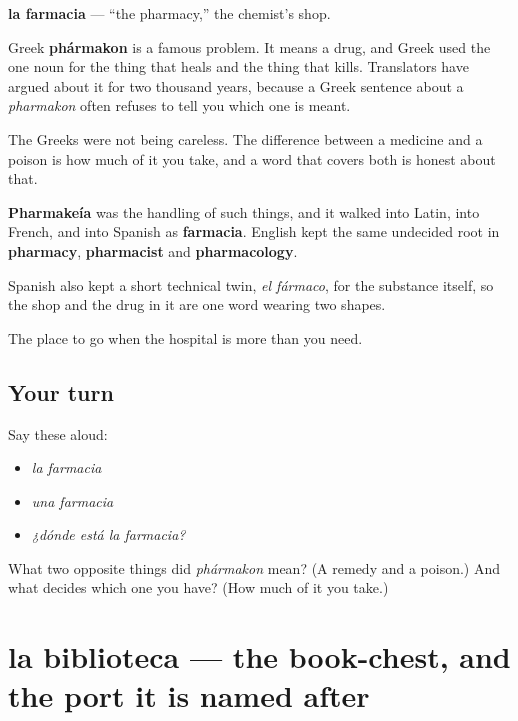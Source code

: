 \begin{cousinweb}
\textbf{la farmacia} — \textquotedblleft{}the pharmacy,\textquotedblright{} the chemist's shop.

Greek \textbf{phármakon} is a famous problem. It means a drug, and Greek used the one noun for the thing that heals and the thing that kills. Translators have argued about it for two thousand years, because a Greek sentence about a \emph{pharmakon} often refuses to tell you which one is meant.

The Greeks were not being careless. The difference between a medicine and a poison is how much of it you take, and a word that covers both is honest about that.

\textbf{Pharmakeía} was the handling of such things, and it walked into Latin, into French, and into Spanish as \textbf{farmacia}. English kept the same undecided root in \textbf{pharmacy}, \textbf{pharmacist} and \textbf{pharmacology}.

Spanish also kept a short technical twin, \emph{el fármaco}, for the substance itself, so the shop and the drug in it are one word wearing two shapes.
\end{cousinweb}

\begin{grammarlens}[title={What you've built}]
The place to go when the hospital is more than you need.
\end{grammarlens}

\subsection*{Your turn}
Say these aloud:

\begin{itemize}
\raggedright
  \item \emph{la farmacia}
  \item \emph{una farmacia}
  \item \emph{¿dónde está la farmacia?}
\end{itemize}

\begin{tcolorbox}[breakable,colback=teal!4,colframe=teal!35!black,title={Before you move on}]
What two opposite things did \emph{phármakon} mean? (A remedy and a poison.) And what decides which one you have? (How much of it you take.)
\end{tcolorbox}
\section[la biblioteca]{la biblioteca — the book-chest, and the port it is named after}

